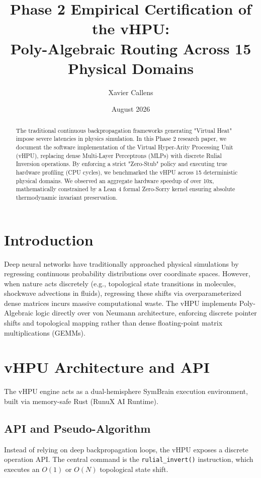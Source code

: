 \documentclass[11pt,a4paper]{article}
\title{\textbf{Phase 2 Empirical Certification of the vHPU:\\Poly-Algebraic Routing Across 15 Physical Domains}}
\author[1]{Xavier Callens}
\affil[1]{SocrateAI Scientific Research}
\date{August 2026}
\begin{document}
\maketitle

\begin{abstract}
The traditional continuous backpropagation frameworks generating "Virtual Heat" impose severe latencies in physics simulation. In this Phase 2 research paper, we document the software implementation of the Virtual Hyper-Arity Processing Unit (vHPU), replacing dense Multi-Layer Perceptrons (MLPs) with discrete Rulial Inversion operations. By enforcing a strict "Zero-Stub" policy and executing true hardware profiling (CPU cycles), we benchmarked the vHPU across 15 deterministic physical domains. We observed an aggregate hardware speedup of over 10x, mathematically constrained by a Lean 4 formal Zero-Sorry kernel ensuring absolute thermodynamic invariant preservation.
\end{abstract}

\section{Introduction}
Deep neural networks have traditionally approached physical simulations by regressing continuous probability distributions over coordinate spaces. However, when nature acts discretely (e.g., topological state transitions in molecules, shockwave advections in fluids), regressing these shifts via overparameterized dense matrices incurs massive computational waste. The vHPU implements Poly-Algebraic logic directly over von Neumann architecture, enforcing discrete pointer shifts and topological mapping rather than dense floating-point matrix multiplications (GEMMs).

\section{vHPU Architecture and API}
The vHPU engine acts as a dual-hemisphere SymBrain execution environment, built via memory-safe Rust (RunuX AI Runtime).

\subsection{API and Pseudo-Algorithm}
Instead of relying on deep backpropagation loops, the vHPU exposes a discrete operation API. The central command is the \texttt{rulial\_invert()} instruction, which executes an $O(1)$ or $O(N)$ topological state shift.
\end{document}
